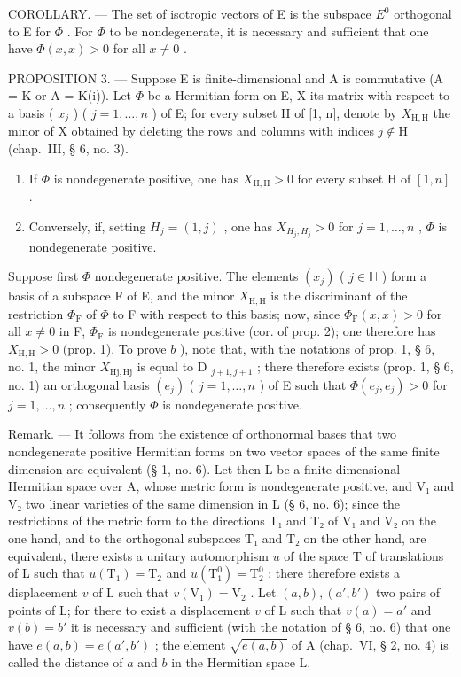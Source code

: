 COROLLARY. --- The set of isotropic vectors of E is the subspace \(E^{0}\) orthogonal to E for \(\Phi\) . For \(\Phi\) to be nondegenerate, it is necessary and sufficient that one have \(\Phi(x, x) > 0\) for all \(x \neq 0\) .

PROPOSITION 3. --- Suppose E is finite-dimensional and A is commutative (A = K or A = K(i)). Let \(\Phi\) be a Hermitian form on E, X its matrix with respect to a basis ( \(x_j\) ) ( \(j = 1, \ldots, n\) ) of E; for every subset H of {[}1, n{]}, denote by \(X_{\mathrm{H,H}}\) the minor of X obtained by deleting the rows and columns with indices \(j \notin \mathrm{H}\) (chap.~III, § 6, no. 3).

\begin{enumerate}
\def\labelenumi{\alph{enumi})}
\item
  If \(\Phi\) is nondegenerate positive, one has \(X_{\mathrm{H,H}} > 0\) for every subset H of \([1, n]\) .
\item
  Conversely, if, setting \(H_{j} = (1, j)\) , one has \(X_{H_{j}, H_{j}} > 0\) for \(j = 1, \ldots, n\) , \(\Phi\) is nondegenerate positive.
\end{enumerate}

Suppose first \(\Phi\) nondegenerate positive. The elements \((x_{j})\) ( \(j\in\mathbb{H}\) ) form a basis of a subspace F of E, and the minor \(X_{\mathrm{H,H}}\) is the discriminant of the restriction \(\Phi_{\mathrm{F}}\) of \(\Phi\) to F with respect to this basis; now, since \(\Phi_{\mathrm{F}}(x,x)>0\) for all \(x\neq0\) in F, \(\Phi_{\mathrm{F}}\) is nondegenerate positive (cor. of prop. 2); one therefore has \(X_{\mathrm{H,H}}>0\) (prop. 1). To prove \(b\) ), note that, with the notations of prop. 1, § 6, no. 1, the minor \(X_{\mathrm{Hj,Hj}}\) is equal to D \(_{j+1,j+1}\) ; there therefore exists (prop. 1, § 6, no. 1) an orthogonal basis \((e_{j})\) ( \(j=1,\ldots,n\) ) of E such that \(\Phi(e_{j},e_{j})>0\) for \(j=1,\ldots,n\) ; consequently \(\Phi\) is nondegenerate positive.

Remark. --- It follows from the existence of orthonormal bases that two nondegenerate positive Hermitian forms on two vector spaces of the same finite dimension are equivalent (§ 1, no. 6). Let then L be a finite-dimensional Hermitian space over A, whose metric form is nondegenerate positive, and V₁ and V₂ two linear varieties of the same dimension in L (§ 6, no. 6); since the restrictions of the metric form to the directions T₁ and T₂ of V₁ and V₂ on the one hand, and to the orthogonal subspaces T₁ and T₂ on the other hand, are equivalent, there exists a unitary automorphism \(u\) of the space T of translations of L such that \(u(\mathrm{T}_1) = \mathrm{T}_2\) and \(u(\mathrm{T}_1^0) = \mathrm{T}_2^0\) ; there therefore exists a displacement \(v\) of L such that \(v(\mathrm{V}_1) = \mathrm{V}_2\) . Let \((a, b), (a', b')\) two pairs of points of L; for there to exist a displacement \(v\) of L such that \(v(a) = a'\) and \(v(b) = b'\) it is necessary and sufficient (with the notation of § 6, no. 6) that one have \(e(a, b) = e(a', b')\) ; the element \(\sqrt{e(a, b)}\) of A (chap.~VI, § 2, no. 4) is called the distance of \(a\) and \(b\) in the Hermitian space L.

